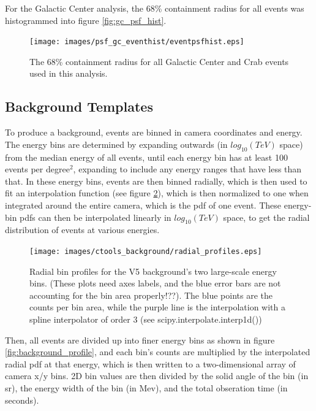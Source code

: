 For the Galactic Center analysis, the 68\% containment radius for all events was histogrammed into figure \ref{fig:gc_psf_hist}.

\begin{figure}[ht]
  \begin{center}
    \texttt{[image: images/psf\_gc\_eventhist/eventpsfhist.eps]}
    \caption[Crab and Galactic Center Event PSFs]{The 68\% containment radius for all Galactic Center and Crab events used in this analysis.}\label{fig:psf_paramspace}
  \end{center}
\end{figure}

\subsection{Background Templates}

To produce a background, events are binned in camera coordinates and energy.
The energy bins are determined by expanding outwards (in $log_{10}(TeV)$ space) from the median energy of all events, until each energy bin has at least 100 events per degree$^2$, expanding to include any energy ranges that have less than that.
In these energy bins, events are then binned radially, which is then used to fit an interpolation function (see figure \ref{fig:background_radial}), which is then normalized to one when integrated around the entire camera, which is the pdf of one event.
These energy-bin pdfs can then be interpolated linearly in $log_{10}(TeV)$ space, to get the radial distribution of events at various energies.

\begin{figure}[ht]
  \begin{center}
    \texttt{[image: images/ctools\_background/radial\_profiles.eps]}
    \caption[CTOOLS Radial Background Profiles]{Radial bin profiles for the V5 background's two large-scale energy bins.  (These plots need axes labels, and the blue error bars are not accounting for the bin area properly!??).  The blue points are the counts per bin area, while the purple line is the interpolation with a spline interpolator of order 3 (see scipy.interpolate.interp1d())}\label{fig:background_radial}
  \end{center}
\end{figure}


Then, all events are divided up into  finer energy bins as shown in figure \ref{fig:background_profile}, and each bin's counts are multiplied by the interpolated radial pdf at that energy, which is then written to a two-dimensional array of camera x/y bins.
2D bin values are then divided by the solid angle of the bin (in sr), the energy width of the bin (in Mev), and the total obseration time (in seconds).

